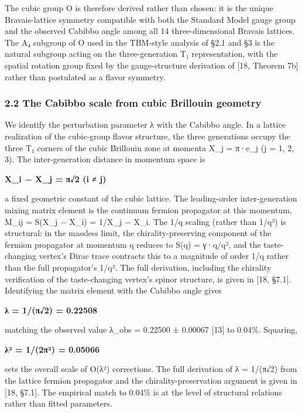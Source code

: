 \documentclass[
  11pt,
  letterpaper,
]{article}
\begin{document}
The cubic group O is therefore derived rather than chosen: it is the
unique Bravais-lattice symmetry compatible with both the Standard Model
gauge group and the observed Cabibbo angle among all 14
three-dimensional Bravais lattices. The A₄ subgroup of O used in the
TBM-style analysis of §2.1 and §3 is the natural subgroup acting on the
three-generation T₁ representation, with the spatial rotation group
fixed by the gauge-structure derivation of {[}18, Theorem 7b{]} rather
than postulated as a flavor symmetry.

\hypertarget{the-cabibbo-scale-from-cubic-brillouin-geometry}{%
\subsubsection{2.2 The Cabibbo scale from cubic Brillouin
geometry}\label{the-cabibbo-scale-from-cubic-brillouin-geometry}}

We identify the perturbation parameter λ with the Cabibbo angle. In a
lattice realization of the cubic-group flavor structure, the three
generations occupy the three T₁ corners of the cubic Brillouin zone at
momenta X\_j = π·e\_j (j = 1, 2, 3). The inter-generation distance in
momentum space is

\textbf{\textbar X\_i − X\_j\textbar{} = π√2 (i ≠ j)}

a fixed geometric constant of the cubic lattice. The leading-order
inter-generation mixing matrix element is the continuum fermion
propagator at this momentum, \textbar M\_ij\textbar{} = \textbar S(X\_j
− X\_i)\textbar{} = 1/\textbar X\_j − X\_i\textbar. The
1/\textbar q\textbar{} scaling (rather than 1/\textbar q\textbar²) is
structural: in the massless limit, the chirality-preserving component of
the fermion propagator at momentum q reduces to S(q) = γ·q/q², and the
taste-changing vertex's Dirac trace contracts this to a magnitude of
order 1/\textbar q\textbar{} rather than the full propagator's
1/\textbar q\textbar². The full derivation, including the chirality
verification of the taste-changing vertex's spinor structure, is given
in {[}18, §7.1{]}. Identifying the matrix element with the Cabibbo angle
gives

\textbf{λ = 1/(π√2) = 0.22508}

matching the observed value λ\_obs = 0.22500 ± 0.00067 {[}13{]} to
0.04\%. Squaring,

\textbf{λ² = 1/(2π²) = 0.05066}

sets the overall scale of O(λ²) corrections. The full derivation of λ =
1/(π√2) from the lattice fermion propagator and the
chirality-preservation argument is given in {[}18, §7.1{]}. The
empirical match to 0.04\% is at the level of structural relations rather
than fitted parameters.
\end{document}
